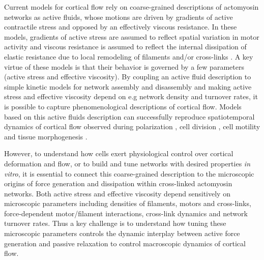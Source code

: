 \documentclass[10pt,letterpaper]{article}
\begin{document}
Current models for cortical flow rely on coarse-grained descriptions of actomyosin networks as active fluids, whose motions are driven by gradients of active contractile stress and opposed by an effectively viscous resistance\cite{cellmech_flows}.  In these models, gradients of active stress are assumed to reflect spatial variation in motor activity and viscous resistance is assumed to reflect the internal dissipation of elastic resistance due to local remodeling of filaments and/or cross-links \cite{PhysRevLett.106.028103}.  A key virtue of these models is that their behavior is governed by a few parameters (active stress and effective viscosity).  By coupling an active fluid description to simple kinetic models for network assembly and disassembly and making active stress and effective viscosity depend on e.g network density and turnover rates, it is possible to capture phenomenological descriptions of cortical flow.  Models based on this active fluids description can successfully reproduce spatiotemporal dynamics of cortical flow observed during polarization \cite{cellmech_flows}, cell division \cite{Turlier2014114,PhysRevLett.103.058102}, cell motility \cite{Keren:2009aa,RevModPhys.85.1143} and tissue morphogenesis \cite{Heisenberg2013948}.  

However, to understand how cells exert physiological control over cortical deformation and flow, or to build and tune networks with desired properties {\em in vitro}, it is essential to connect this coarse-grained description to the microscopic origins of force generation and dissipation within cross-linked actomyosin networks.  Both active stress and effective viscosity depend sensitively on microscopic parameters including densities of filaments, motors and cross-links, force-dependent motor/filament interactions, cross-link dynamics and network turnover rates.  Thus a key challenge is to understand how tuning these microscopic parameters controls the dynamic interplay between active force generation and passive relaxation to control macroscopic dynamics of cortical flow.
\end{document}
